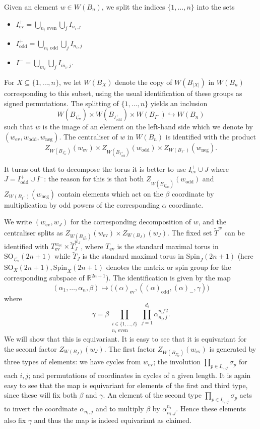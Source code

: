 \documentclass[11pt,a4paper]{article}
\def\Spin{\mathrm{Spin}}
\def\SO{\mathrm{SO}}
\def\R{\mathbb{R}}
\def\mbar{\overline{m}}
\def\mbar{\overline{m}}
\def\coveringtorus{\tilde{T}}
\def\ev{\mathrm{ev}}
\def\odd{\mathrm{odd}}
\def\neg{\mathrm{neg}}
\begin{document}
Given an element $w\in W(B_n)$, we split the indices $\{1,\dots,n\}$ into the sets
\begin{itemize}
    \item $I^+_{\ev}=\bigcup\limits_{n_i \text{ even}}\bigcup\limits_j I_{n_i,j}$
    
    \item $I^+_{\odd}=\bigcup\limits_{n_i \text{ odd}}\bigcup\limits_jI_{n_i,j}$

    \item $I^-=\bigcup\limits_{m_i}\bigcup\limits_j I_{\mbar_i,j}$.
\end{itemize}

For $X\subseteq \{1,\dots, n\}$, we let $W(B_X)$ denote the copy of $W(B_{|X|})$ in $W(B_n)$ corresponding to this subset, using the usual identification of these groups as signed permutations. The splitting of $\{1,\dots, n\}$ yields an inclusion
\[
W(B_{I^+_{\ev}})\times W(B_{I^+_{\odd}})\times W(B_{I^-}) \hookrightarrow W(B_n)
\]
such that $w$ is the image of an element on the left-hand side which we denote by $(w_{\ev},w_{\odd},w_\neg)$. The centraliser of $w$ in $W(B_n)$ is identified with the product \[
Z_{W(B_{I^+_{\ev}})}(w_{\ev})\times Z_{W(B_{I^+_{\odd}})}(w_{\odd})\times Z_{W(B_{I^-})}(w_\neg).
\]

It turns out that to decompose the torus it is better to use $I^+_{\ev}\cup J$ where $J=I^+_{\odd}\cup I^-$: the reason for this is that both $Z_{W(B_{I^+_{\odd}})}(w_{\odd})$ and $Z_{W(B_{I^-})}(w_\neg)$ contain elements which act on the $\beta$ coordinate by multiplication by odd powers of the corresponding $\alpha$ coordinate.

We write $(w_{\ev},w_{J})$ for the corresponding decomposition of $w$, and the centraliser splits as $Z_{W(B_{I^+_{\ev}})}(w_{\ev})\times Z_{W(B_{J})}(w_{J})$.  The fixed set $\coveringtorus^w$ can be identified with $T_\ev^{w_{\ev}}\times \coveringtorus^{w_J}_J$, where $T_\ev$ is the standard maximal torus in $\SO_{I^+_{\ev}}(2n+1)$ while $\coveringtorus_J$ is the standard maximal torus in $\Spin_J(2n+1)$ (here $\SO_X(2n+1),\Spin_X(2n+1)$ denotes the matrix or spin group for the corresponding subspace of $\R^{2n+1}$). The identification is given by the map
\[
(\alpha_1,\dots,\alpha_n,\beta) \mapsto \big((\alpha)_{\ev},((\alpha)_{\odd},(\alpha)_-,\gamma)\big)
\]
where
\[
\gamma=\beta\prod_{\substack{i \in \{1,\dots,l\}\\n_i\text{ even}}}\prod_{j=1}^{d_i}\alpha_{n_i,j}^{n_i/2}.
\]
We will show that this is equivariant.  It is easy to see that it is equivariant for the second factor $Z_{W(B_{J})}(w_J)$. The first factor $Z_{W(B_{I^+_{\ev}})}(w_{\ev})$ is generated by three types of elements:  we have cycles from $w_{\ev}$; the involution $\prod_{p\in I_{n_i,j}} \sigma_p$ for each $i,j$; and permutations of coordinates in cycles of a given length. It is again easy to see that the map is equivariant for elements of the first and third type, since these will fix both $\beta$ and $\gamma$. An element of the second type $\prod_{p\in I_{n_i,j}} \sigma_p$ acts to invert the coordinate $\alpha_{n_i,j}$ and to multiply $\beta$ by $\alpha_{n_i,j}^{n_i}$. Hence these elements also fix $\gamma$ and thus the map is indeed equivariant as claimed.
\end{document}
